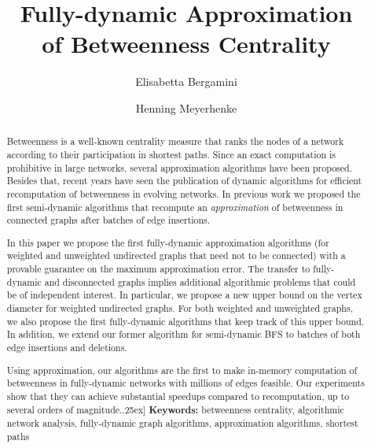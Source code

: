 \documentclass[english]{llncs}
\begin{document}
\author{Elisabetta Bergamini \and Henning Meyerhenke}

\title{Fully-dynamic Approximation \\ of Betweenness Centrality}

\date{}

\maketitle

\begin{abstract}
Betweenness is a well-known centrality measure that ranks the nodes of a network according to their participation in shortest paths.
Since an exact computation is prohibitive in large networks, several approximation algorithms have been proposed. Besides that, recent years
have seen the publication of dynamic algorithms for efficient recomputation of betweenness in evolving networks. In previous work  we
proposed the first semi-dynamic algorithms that recompute an \emph{approximation} of betweenness in connected graphs after batches of edge insertions. 

In this paper we propose the first fully-dynamic approximation algorithms (for weighted and unweighted undirected graphs that need not to be connected) with a provable guarantee on the maximum approximation error.
The transfer to fully-dynamic and disconnected graphs implies additional algorithmic problems that could be of independent interest. In particular, we propose a new upper bound on the vertex diameter for weighted undirected graphs. For both weighted and unweighted graphs, we also propose the first fully-dynamic algorithms that keep track of this upper bound.
In addition, we extend our former algorithm for semi-dynamic BFS to batches of both edge insertions and deletions. 

Using approximation, our algorithms are the first to make in-memory computation of betweenness in fully-dynamic networks with millions of edges feasible. Our experiments show that they can achieve substantial speedups compared to recomputation, up to 
several orders of magnitude.\0.25ex]
\noindent \textbf{Keywords:}  betweenness centrality, algorithmic network analysis, fully-dynamic graph algorithms, approximation algorithms, shortest paths
\end{abstract}
\end{document}
